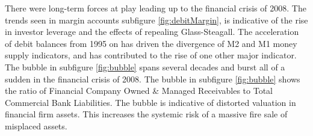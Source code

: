 
%



There were long-term forces at play leading up to the financial crisis of 2008.  The trends seen in margin accounts subfigure \ref{fig:debitMargin}, is indicative of the rise in investor leverage and the effects of repealing Glass-Steagall.  The acceleration of debit balances from 1995 on has driven the divergence of M2 and M1 money supply indicators, and has contributed to the rise of one other major indicator.  The bubble in subfigure \ref{fig:bubble} spans several decades and burst all of a sudden in the financial crisis of 2008.  The bubble in subfigure \ref{fig:bubble} shows the ratio of Financial Company Owned \& Managed Receivables to Total Commercial Bank Liabilities.  The bubble is indicative of distorted valuation in financial firm assets.  This increases the systemic risk of a massive fire sale of misplaced assets.  

